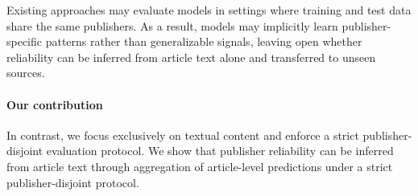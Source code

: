 \documentclass[journal]{IEEEtran}
\begin{document}
Existing approaches may evaluate models in settings where training and test data share the same publishers. As a result, models may implicitly learn publisher-specific patterns rather than generalizable signals, leaving open whether reliability can be inferred from article text alone and transferred to unseen sources.

\paragraph{Our contribution} In contrast, we focus exclusively on textual content and enforce a strict publisher-disjoint evaluation protocol. We show that publisher reliability can be inferred from article text through aggregation of article-level predictions under a strict publisher-disjoint protocol.




\end{document}
